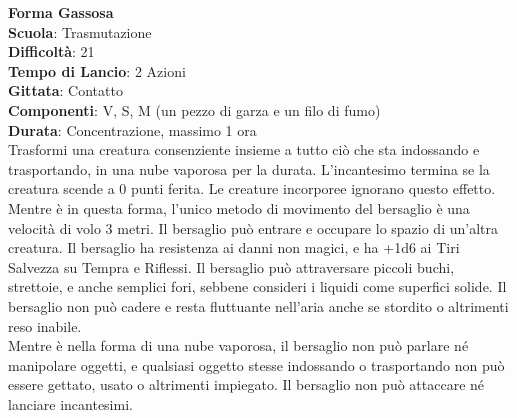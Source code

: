 \begin{multicols}{2}
\medskip\textbf{Forma Gassosa}\\
\textbf{Scuola}: Trasmutazione\\
\textbf{Difficoltà}: 21\\
\textbf{Tempo di Lancio}: 2 Azioni\\
\textbf{Gittata}: Contatto\\
\textbf{Componenti}: V, S, M (un pezzo di garza e un filo di fumo)\\
\textbf{Durata}: Concentrazione, massimo 1 ora\\
Trasformi una creatura consenziente insieme a tutto ciò che sta indossando e trasportando, in una nube vaporosa per la durata. L'incantesimo termina se la creatura scende a 0 punti ferita. Le creature incorporee ignorano questo effetto. Mentre è in questa forma, l'unico metodo di movimento del bersaglio è una velocità di volo 3 metri. Il bersaglio può entrare e occupare lo spazio di un'altra creatura. Il bersaglio ha resistenza ai danni non magici, e ha +1d6 ai Tiri Salvezza su Tempra e Riflessi. Il bersaglio può attraversare piccoli buchi, strettoie, e anche semplici fori, sebbene consideri i liquidi come superfici solide. Il bersaglio non può cadere e resta fluttuante nell'aria anche se stordito o altrimenti reso inabile.\\
Mentre è nella forma di una nube vaporosa, il bersaglio non può parlare né manipolare oggetti, e qualsiasi oggetto stesse indossando o trasportando non può essere gettato, usato o altrimenti impiegato. Il bersaglio non può attaccare né lanciare incantesimi. 


\end{multicols}
